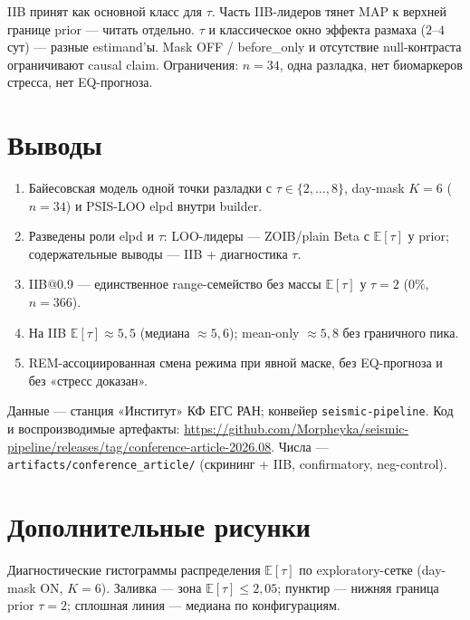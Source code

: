 \documentclass{article}
\begin{document}
IIB принят как основной класс для \(\tau\). Часть IIB-лидеров тянет MAP к верхней границе prior --- читать отдельно. \(\tau\) и классическое окно эффекта размаха (\(2\)--\(4\) сут) --- разные estimand'ы. Mask OFF / before\_only и отсутствие null-контраста ограничивают causal claim. Ограничения: \(n=34\), одна разладка, нет биомаркеров стресса, нет EQ-прогноза.


\section{Выводы}

\begin{enumerate}[leftmargin=1.2em,itemsep=0.35em]
\item Байесовская модель одной точки разладки с \(\tau\in\{2,\ldots,8\}\), day-mask \(K=6\) (\(n=34\)) и PSIS-LOO elpd внутри builder.
\item Разведены роли elpd и \(\tau\): LOO-лидеры --- ZOIB/plain Beta с \(\mathbb{E}[\tau]\) у prior; содержательные выводы --- IIB + диагностика \(\tau\).
\item IIB@0.9 --- единственное range-семейство без массы \(\mathbb{E}[\tau]\) у \(\tau=2\) (\(0\%\), \(n=366\)).
\item На IIB \(\mathbb{E}[\tau]\approx 5{,}5\) (медиана \(\approx 5{,}6\)); mean-only \(\approx 5{,}8\) без граничного пика.
\item REM-ассоциированная смена режима при явной маске, без EQ-прогноза и без «стресс доказан».
\end{enumerate}


\begin{ack}
Данные --- станция «Институт» КФ ЕГС РАН; конвейер \texttt{seismic-pipeline}.
Код и воспроизводимые артефакты: \url{https://github.com/Morpheyka/seismic-pipeline/releases/tag/conference-article-2026.08}. Числа --- \texttt{artifacts/conference\_article/} (скрининг + IIB, confirmatory, neg-control).
\end{ack}

{\small


}


\clearpage
\onecolumn
\appendix
\section{Дополнительные рисунки}
\label{app:figures}

Диагностические гистограммы распределения \(\mathbb{E}[\tau]\) по exploratory-сетке (day-mask ON, \(K=6\)). Заливка --- зона \(\mathbb{E}[\tau]\le 2{,}05\); пунктир --- нижняя граница prior \(\tau=2\); сплошная линия --- медиана по конфигурациям.
\end{document}
